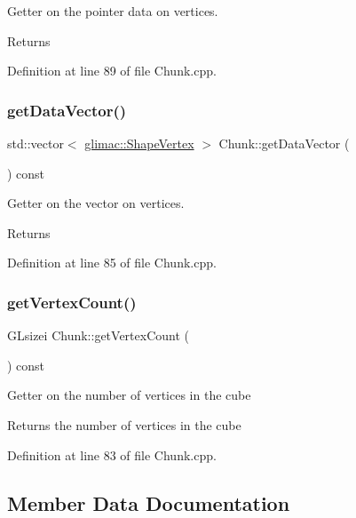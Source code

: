 Getter on the pointer data on vertices. \begin{DoxyReturn}{Returns}

\end{DoxyReturn}


Definition at line 89 of file Chunk.\+cpp.

\mbox{\label{class_chunk_a3d98f0c77cbac2a770ccb0447e4b7031}} 
\subsubsection{\texorpdfstring{get\+Data\+Vector()}{getDataVector()}}
{\footnotesize\ttfamily std\+::vector$<$ \hyperlink{structglimac_1_1_shape_vertex}{glimac\+::\+Shape\+Vertex} $>$ Chunk\+::get\+Data\+Vector (\begin{DoxyParamCaption}{ }\end{DoxyParamCaption}) const}

Getter on the vector on vertices. \begin{DoxyReturn}{Returns}

\end{DoxyReturn}


Definition at line 85 of file Chunk.\+cpp.

\mbox{\label{class_chunk_ac4a282e5b7f412244e73b0d3a8177af1}} 
\subsubsection{\texorpdfstring{get\+Vertex\+Count()}{getVertexCount()}}
{\footnotesize\ttfamily G\+Lsizei Chunk\+::get\+Vertex\+Count (\begin{DoxyParamCaption}{ }\end{DoxyParamCaption}) const}

Getter on the number of vertices in the cube \begin{DoxyReturn}{Returns}
the number of vertices in the cube 
\end{DoxyReturn}


Definition at line 83 of file Chunk.\+cpp.



\subsection{Member Data Documentation}
\mbox{\label{class_chunk_afe86634c18099b7975b0ce2de7a040ec}} 
